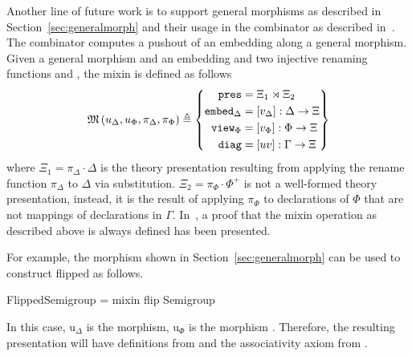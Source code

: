 Another line of future work is to support general morphisms as described in Section~\ref{sec:generalmorph} and their usage in the  combinator as described in~\cite{carette2018building}. 
The  combinator computes a pushout of an embedding along a general morphism. Given a general morphism  and an embedding  and two injective renaming functions 
and , the mixin is defined as follows 
\[
\mathfrak{M}\left( u_{\Delta}, u_{\Phi}, \pi_{\Delta}, \pi_{\Phi}\right) \triangleq
\left\{\begin{aligned}
  \mathtt{pres} & = \Xi_1\rtimes\Xi_2 \\
  \mathtt{embed}_{\Delta} & = \left[v_{\Delta}\right] : \Delta\rightarrow\Xi\\
  \mathtt{view}_{\Phi} & = \left[v_{\Phi}\right] : \Phi\rightarrow\Xi\\
  \mathtt{diag} & = \left[uv\right]:\Gamma\rightarrow\Xi\\
\end{aligned}\right\}
\]
where $\Xi_1 = \pi_\Delta \cdot \Delta$ is the theory presentation resulting from applying the rename function $\pi_\Delta$ to $\Delta$ via substitution. 
$\Xi_2 = \pi_\Phi \cdot \Phi^+$ is not a well-formed theory presentation, instead, it is the result of applying $\pi_\Phi$ to declarations of $\Phi$ that are not mappings of declarations in $\Gamma$. 
In~\cite{carette2018building}, a proof that the mixin operation as described above is always defined has been presented. 

For example, the morphism  shown in Section~\ref{sec:generalmorph} can be used to construct flipped  as follows. 
\begin{togcode} 
FlippedSemigroup = mixin flip {} Semigroup {} 
\end{togcode} 
In this case, $\text{u}_\Delta$ is the  morphism, $\text{u}_\Phi$ is the morphism . Therefore, the resulting presentation  will have definitions from  and the associativity axiom from . 


